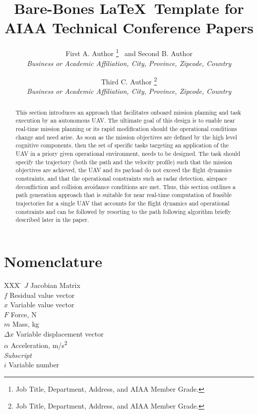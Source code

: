 \documentclass[]{aiaa-tc}%
\title{Bare-Bones \LaTeX\ Template for\\
        AIAA Technical Conference Papers}
\author{
  First A. Author%
    \thanks{Job Title, Department, Address, and AIAA Member Grade.}
  \ and Second B. Author\thanksibid{1}\\
  {\normalsize\itshape
   Business or Academic Affiliation, City, Province, Zipcode, Country}\\
  \and
  Third C. Author%
   \thanks{Job Title, Department, Address, and AIAA Member Grade.}\\
  {\normalsize\itshape
  Business or Academic Affiliation, City, Province, Zipcode, Country}
 }
\begin{document}
\maketitle

\begin{abstract}
This section introduces an approach that facilitates onboard mission planning and
task execution by an autonomous UAV. The ultimate goal of this design is to enable
near real-time mission planning or its rapid modification should the operational
conditions change and need arise. As soon as the mission objectives are defined by
the high level cognitive components, then the set of specific tasks targeting an
application of the UAV in a priory given operational environment, needs to be
designed. The task should specify the trajectory (both the path and the velocity
profile) such that the mission objectives are achieved, the UAV and its payload do
not exceed the flight dynamics constraints, and that the operational constraints such
as radar detection, airspace deconfliction and collision avoidance conditions are
met. Thus, this section outlines a path generation approach that is suitable for near
real-time computation of feasible trajectories for a single UAV that accounts for the
flight dynamics and operational constraints and can be followed by resorting to the
path following algorithm\cite{JGCD10_PFL1aug} briefly described later in the paper.
\end{abstract}

\section*{Nomenclature}

\begin{tabbing}
  XXX \= \kill%
  $J$ \> Jacobian Matrix \\
  $f$ \> Residual value vector \\
  $x$ \> Variable value vector \\
  $F$ \> Force, N \\
  $m$ \> Mass, kg \\
  $\Delta x$ \> Variable displacement vector \\
  $\alpha$ \> Acceleration, m/s\textsuperscript{2} \\[5pt]
  \textit{Subscript}\\
  $i$ \> Variable number \\
 \end{tabbing}
\end{document}
